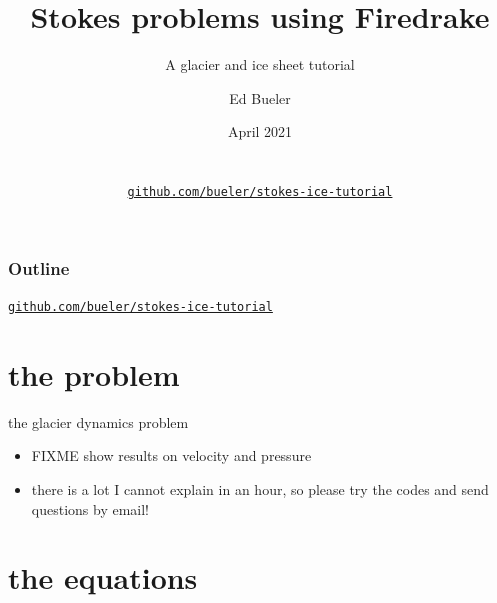 \documentclass[10pt,hyperref,dvipsnames]{beamer}
\title{Stokes problems using Firedrake}
\subtitle{A glacier and ice sheet tutorial}
\author{Ed Bueler}
\institute[UAF]{University of Alaska Fairbanks}
\date[April 2021]{April 2021  \\ \phantom{foo} \\ \phantom{foo} \\
\large \href{https://github.com/bueler/stokes-ice-tutorial}{\alert{\texttt{github.com/bueler/stokes-ice-tutorial}}} }
\begin{document}
\beamertemplatenavigationsymbolsempty

\begin{frame}
  \maketitle
\end{frame}

\begin{frame}
  \frametitle{Outline}

\centerline{\large \href{https://github.com/bueler/stokes-ice-tutorial}{\alert{\texttt{github.com/bueler/stokes-ice-tutorial}}}}

\bigskip
  \tableofcontents[hideallsubsections]
\end{frame}


\section{the problem}

\begin{frame}{the glacier dynamics problem}

\begin{itemize}
\item FIXME show results on velocity and pressure
\item \alert{there is a lot I cannot explain in an hour, so please try the codes and send questions by email!}
\end{itemize}
\end{frame}

\section{the equations}
\end{document}
